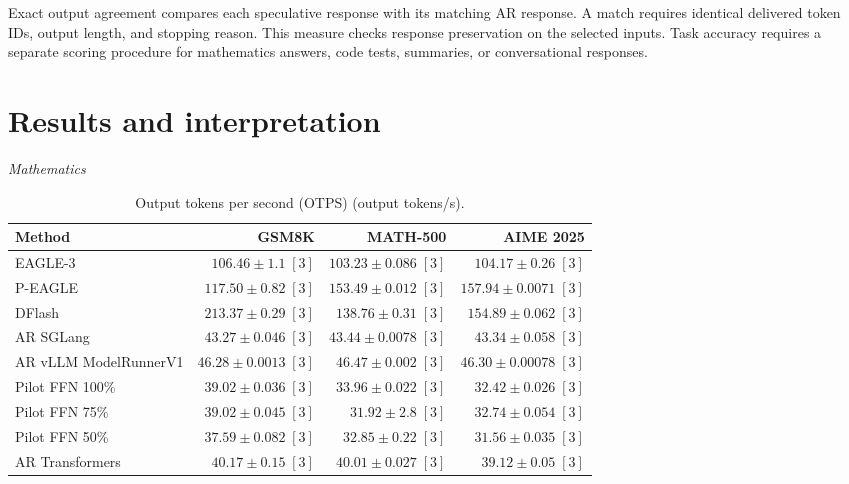 \documentclass[conference,onecolumn]{IEEEtran}
\begin{document}
Exact output agreement compares each speculative response with its matching AR response. A match requires identical delivered token IDs, output length, and stopping reason. This measure checks response preservation on the selected inputs. Task accuracy requires a separate scoring procedure for mathematics answers, code tests, summaries, or conversational responses.

\section{Results and interpretation}
\begin{table}[!tp]
\centering
\small
\setlength{\tabcolsep}{3pt}
\caption{Output tokens per second (OTPS) (output tokens/s).}
\label{tab:otps}
\textit{Mathematics}\par\smallskip
\begin{tabular}{@{}>{\raggedright\arraybackslash}p{3.7cm}rrr@{}}
\toprule
Method & GSM8K & MATH-500 & AIME 2025 \\
\midrule
EAGLE-3 & \(106.46 \pm 1.1\;[3]\) & \(103.23 \pm 0.086\;[3]\) & \(104.17 \pm 0.26\;[3]\) \\
P-EAGLE & \(117.50 \pm 0.82\;[3]\) & \(\mathbf{153.49} \pm 0.012\;[3]\) & \(\mathbf{157.94} \pm 0.0071\;[3]\) \\
DFlash & \(\mathbf{213.37} \pm 0.29\;[3]\) & \(138.76 \pm 0.31\;[3]\) & \(154.89 \pm 0.062\;[3]\) \\
AR \textperiodcentered{} SGLang & \(43.27 \pm 0.046\;[3]\) & \(43.44 \pm 0.0078\;[3]\) & \(43.34 \pm 0.058\;[3]\) \\
AR \textperiodcentered{} vLLM ModelRunnerV1 & \(46.28 \pm 0.0013\;[3]\) & \(46.47 \pm 0.002\;[3]\) & \(46.30 \pm 0.00078\;[3]\) \\
Pilot FFN 100\% & \(39.02 \pm 0.036\;[3]\) & \(33.96 \pm 0.022\;[3]\) & \(32.42 \pm 0.026\;[3]\) \\
Pilot FFN 75\% & \(39.02 \pm 0.045\;[3]\) & \(31.92 \pm 2.8\;[3]\) & \(32.74 \pm 0.054\;[3]\) \\
Pilot FFN 50\% & \(37.59 \pm 0.082\;[3]\) & \(32.85 \pm 0.22\;[3]\) & \(31.56 \pm 0.035\;[3]\) \\
AR \textperiodcentered{} Transformers & \(40.17 \pm 0.15\;[3]\) & \(40.01 \pm 0.027\;[3]\) & \(39.12 \pm 0.05\;[3]\) \\
\bottomrule
\end{tabular}

\end{table}
\end{document}
